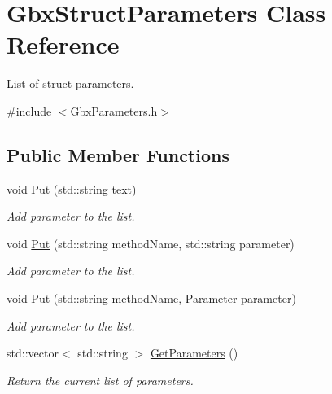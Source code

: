 \hypertarget{classGbxStructParameters}{\section{Gbx\-Struct\-Parameters Class Reference}
\label{classGbxStructParameters}
}


List of struct parameters.  




{\ttfamily \#include $<$Gbx\-Parameters.\-h$>$}

\subsection*{Public Member Functions}
\begin{DoxyCompactItemize}
\item 
void \hyperlink{classGbxStructParameters_a1e045e8f50d30cdd810df10f3346bee4}{Put} (std\-::string text)
\begin{DoxyCompactList}\small\item\em Add parameter to the list. \end{DoxyCompactList}\item 
void \hyperlink{classGbxStructParameters_a97d487bfc030380abd4a6342139de30f}{Put} (std\-::string method\-Name, std\-::string parameter)
\begin{DoxyCompactList}\small\item\em Add parameter to the list. \end{DoxyCompactList}\item 
void \hyperlink{classGbxStructParameters_a6661fc06c7721857dd4e65a6edd8c8d5}{Put} (std\-::string method\-Name, \hyperlink{structParameter}{Parameter} parameter)
\begin{DoxyCompactList}\small\item\em Add parameter to the list. \end{DoxyCompactList}\item 
\hypertarget{classGbxStructParameters_a5d496ceb658abca1300ae093d26abedc}{std\-::vector$<$ std\-::string $>$ \hyperlink{classGbxStructParameters_a5d496ceb658abca1300ae093d26abedc}{Get\-Parameters} ()}\label{classGbxStructParameters_a5d496ceb658abca1300ae093d26abedc}

\begin{DoxyCompactList}\small\item\em Return the current list of parameters. \end{DoxyCompactList}\end{DoxyCompactItemize}
